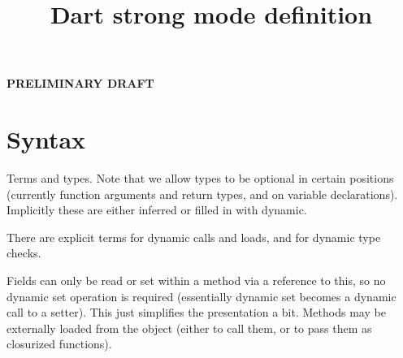 \documentclass[fleqn, draft]{article}
\title{Dart strong mode definition}
\begin{document}
\textbf{\large PRELIMINARY DRAFT}

\section*{Syntax}


Terms and types.  Note that we allow types to be optional in certain positions
(currently function arguments and return types, and on variable declarations).
Implicitly these are either inferred or filled in with dynamic.

There are explicit terms for dynamic calls and loads, and for dynamic type
checks.

Fields can only be read or set within a method via a reference to this, so no
dynamic set operation is required (essentially dynamic set becomes a dynamic
call to a setter).  This just simplifies the presentation a bit.  Methods may be
externally loaded from the object (either to call them, or to pass them as
closurized functions).
\end{document}
